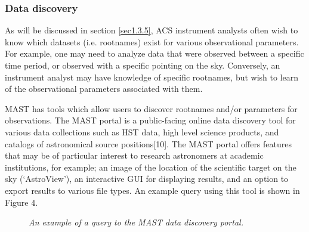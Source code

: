 \documentclass[10pt,journal,compsoc]{IEEEtran}
\begin{document}
\subsubsection{Data discovery} \label{sec1.3.4}

As will be discussed in section \ref{sec1.3.5}, ACS instrument analysts often wish to know which datasets (i.e. rootnames) exist for various observational parameters.
For example, one may need to analyze data that were observed between a specific time period, or observed with a specific pointing on the sky.  Conversely, an instrument analyst
may have knowledge of specific rootnames, but wish to learn of the observational parameters associated with them.

MAST has tools which allow users to discover rootnames and/or parameters for observations.  The MAST portal is a public-facing online data discovery tool for
various data collections such as HST data, high level science products, and catalogs of astronomical source positions[10].  The MAST portal offers features that may be of particular
interest to research astronomers at academic institutions, for example; an image of the location of the scientific target on the sky (`AstroView'), an interactive GUI for displaying
results, and an option to export results to various file types.  An example query using this tool is shown in Figure 4.

\begin{figure}[!t]
\centering
{}
\caption{\textit{An example of a query to the MAST data discovery portal.}}
\label{fig4}
\end{figure}
\end{document}
